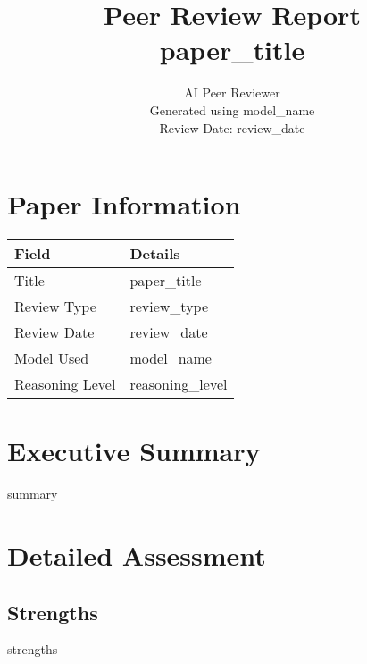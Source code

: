 \documentclass[11pt,letterpaper]{article}
\begin{document}
\title{\textbf{Peer Review Report}\\
\large {{ paper_title }}}
\author{AI Peer Reviewer\\
\small Generated using {{ model_name }}\\
\small Review Date: {{ review_date }}}
\date{}
\maketitle

\thispagestyle{empty}
\newpage

\tableofcontents
\newpage

\section{Paper Information}

\begin{table}[h]
\begin{tabular}{@{}ll@{}}
\toprule
\textbf{Field} & \textbf{Details} \\
\midrule
Title & {{ paper_title }} \\
Review Type & {{ review_type }} \\
Review Date & {{ review_date }} \\
Model Used & {{ model_name }} \\
Reasoning Level & {{ reasoning_level }} \\
\bottomrule
\end{tabular}
\end{table}

\section{Executive Summary}

\begin{summarybox}
{{ summary }}
\end{summarybox}

\section{Detailed Assessment}

\subsection{Strengths}

\begin{strengthsbox}
{{ strengths }}
\end{strengthsbox}
\end{document}
